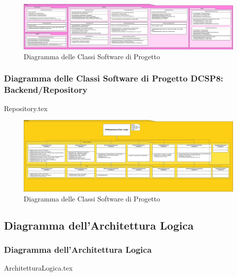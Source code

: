 \documentclass[12pt]{article}
\begin{document}
\begin{figure}[H]
    \includegraphics[width=\textwidth, height=\textheight,keepaspectratio]{Immagini/DCSP/Iterazione 1/Backend/DCSPService.png}
        \caption{Diagramma delle Classi Software di Progetto}
        \label{fig:diagrammaDCSP7}
\end{figure}

\subsubsection{Diagramma delle Classi Software di Progetto DCSP8: Backend/Repository}
{Repository.tex}

\begin{figure}[H]
    \includegraphics[width=\textwidth, height=\textheight,keepaspectratio]{Immagini/DCSP/Iterazione 1/Backend/DCSPRepository.png}
        \caption{Diagramma delle Classi Software di Progetto}
        \label{fig:diagrammaDCSP8}
\end{figure}

\subsection{Diagramma dell'Architettura Logica}

\subsubsection{Diagramma dell'Architettura Logica}
{ArchitetturaLogica.tex}
\end{document}
